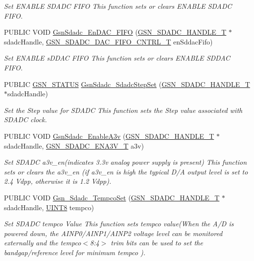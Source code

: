 \begin{DoxyCompactItemize}
\begin{DoxyCompactList}\small\item\em Set ENABLE SDADC FIFO This function sets or clears ENABLE SDADC FIFO. \end{DoxyCompactList}\item 
PUBLIC VOID \hyperlink{a00652_ga06abdba260656ce57bd1e8871d9bc182}{GsnSdadc\_\-EnDAC\_\-FIFO} (\hyperlink{a00214}{GSN\_\-SDADC\_\-HANDLE\_\-T} $\ast$sdadcHandle, \hyperlink{a00652_ga1a95b10a6598d0019aec9049a8e37f19}{GSN\_\-SDADC\_\-DAC\_\-FIFO\_\-CNTRL\_\-T} enSddacFifo)
\begin{DoxyCompactList}\small\item\em Set ENABLE sDDAC FIFO This function sets or clears ENABLE SDDAC FIFO. \end{DoxyCompactList}\item 
PUBLIC \hyperlink{a00660_gada5951904ac6110b1fa95e51a9ddc217}{GSN\_\-STATUS} \hyperlink{a00652_gae0e0267e2151f315372e6160dbe65134}{GsnSdadc\_\-SdadcStepSet} (\hyperlink{a00214}{GSN\_\-SDADC\_\-HANDLE\_\-T} $\ast$sdadcHandle)
\begin{DoxyCompactList}\small\item\em Set the Step value for SDADC This function sets the Step value associated with SDADC clock. \end{DoxyCompactList}\item 
PUBLIC VOID \hyperlink{a00652_ga6636e214171d878bc65826cc1e251520}{GsnSdadc\_\-EnableA3v} (\hyperlink{a00214}{GSN\_\-SDADC\_\-HANDLE\_\-T} $\ast$sdadcHandle, \hyperlink{a00652_ga7c75febfa676ff7198e6665692e07c61}{GSN\_\-SDADC\_\-ENA3V\_\-T} a3v)
\begin{DoxyCompactList}\small\item\em Set SDADC a3v\_\-en(indicates 3.3v analog power supply is present) This function sets or clears the a3v\_\-en (if a3v\_\-en is high the typical D/A output level is set to 2.4 Vdpp, otherwise it is 1.2 Vdpp). \end{DoxyCompactList}\item 
PUBLIC VOID \hyperlink{a00652_ga961a674691b0d10c346638e4f38bf72d}{Gsn\_\-Sdadc\_\-TempcoSet} (\hyperlink{a00214}{GSN\_\-SDADC\_\-HANDLE\_\-T} $\ast$sdadcHandle, \hyperlink{a00660_gab27e9918b538ce9d8ca692479b375b6a}{UINT8} tempco)
\begin{DoxyCompactList}\small\item\em Set SDADC tempco Value This function sets tempco value(When the A/D is powered down, the AINP0/AINP1/AINP2 voltage level can be monitored externally and the tempco$<$8:4$>$ trim bits can be used to set the bandgap/reference level for minimum tempco ). \end{DoxyCompactList}\item 

\end{DoxyCompactItemize}
